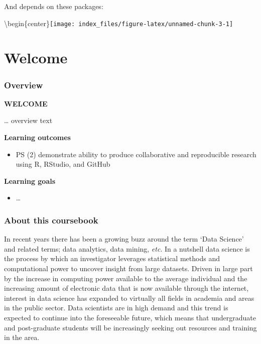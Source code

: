 \documentclass[
]{article}
\providecommand{\tightlist}{%
  \setlength{\itemsep}{0pt}\setlength{\parskip}{0pt}}
\begin{document}
And depends on these packages:

\textbackslash begin\{center\}\texttt{[image: index\_files/figure-latex/unnamed-chunk-3-1]}

\hypertarget{part-welcome}{%
\part{Welcome}\label{part-welcome}}

\hypertarget{course-overview}{%
\section*{Overview}\label{course-overview}}

\textbf{WELCOME}

\ldots{} overview text

\textbf{Learning outcomes}

\begin{itemize}
\tightlist
\item
  PS (2) demonstrate ability to produce collaborative and reproducible research using R, RStudio, and GitHub
\end{itemize}

\textbf{Learning goals}

\begin{itemize}
\tightlist
\item
  \ldots{}
\end{itemize}

\hypertarget{about-this-coursebook}{%
\section*{About this coursebook}\label{about-this-coursebook}}

In recent years there has been a growing buzz around the term `Data Science' and related terms; data analytics, data mining, \emph{etc}. In a nutshell data science is the process by which an investigator leverages statistical methods and computational power to uncover insight from large datasets. Driven in large part by the increase in computing power available to the average individual and the increasing amount of electronic data that is now available through the internet, interest in data science has expanded to virtually all fields in academia and areas in the public sector. Data scientists are in high demand and this trend is expected to continue into the foreseeable future, which means that undergraduate and post-graduate students will be increasingly seeking out resources and training in the area.
\end{document}
